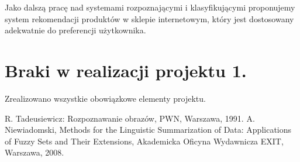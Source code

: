 \documentclass{classrep}
\begin{document}
Jako dalszą pracę nad systemami rozpoznającymi i klasyfikującymi proponujemy system rekomendacji produktów w sklepie internetowym, który jest dostosowany adekwatnie do preferencji użytkownika.



\section{Braki w realizacji projektu 1.}
Zrealizowano wszystkie obowiązkowe elementy projektu.


\begin{thebibliography}{0}
 R. Tadeusiewicz: Rozpoznawanie obrazów, PWN, Warszawa, 1991.  
 A. Niewiadomski, Methods for the Linguistic Summarization of Data: Applications of Fuzzy Sets and Their Extensions, Akademicka Oficyna Wydawnicza EXIT, Warszawa, 2008.
\end{thebibliography}
\end{document}
